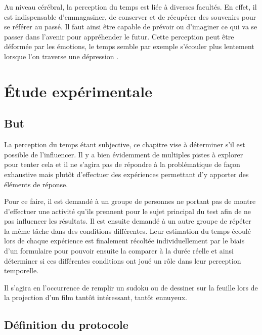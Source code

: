 \documentclass[12pt,fleqn,oneside,openany,]{book} %
\begin{document}
Au niveau cérébral, la perception du temps est liée à diverses facultés. En effet, il est indispensable d'emmagasiner, de conserver et de récupérer des souvenirs pour se référer au passé. Il faut ainsi être capable de prévoir ou d'imaginer ce qui va se passer dans l'avenir pour appréhender le futur. Cette perception peut être déformée par les émotions, le temps semble par exemple s'écouler plus lentement lorsque l'on traverse une dépression \cite{emotiontemps}. 


\chapter{\'Etude expérimentale} \label{cha:etudeExp}


\section{But} \label{sec:butExp}
La perception du temps étant subjective, ce chapitre vise à déterminer s'il est possible de l'influencer. Il y a bien évidemment de multiples pistes à explorer pour tenter cela et il ne s'agira pas de répondre à la problématique de façon exhaustive mais plutôt d'effectuer des expériences permettant d'y apporter des éléments de réponse. 

Pour ce faire, il est demandé à un groupe de personnes ne portant pas de montre d'effectuer une activité qu'ils prennent pour le sujet principal du test afin de ne pas influencer les résultats. Il est ensuite demandé à un autre groupe de répéter la même tâche dans des conditions différentes. Leur estimation du temps écoulé lors de chaque expérience est finalement récoltée individuellement par le biais d'un formulaire pour pouvoir ensuite la comparer à la durée réelle et ainsi déterminer si ces différentes conditions ont joué un rôle dans leur perception temporelle.

Il s'agira en l'occurrence de remplir un sudoku ou de dessiner sur la feuille lors de la projection d'un film tantôt intéressant, tantôt ennuyeux. 


\section{Définition du protocole} \label{sec:DefinitionProto}
\end{document}
